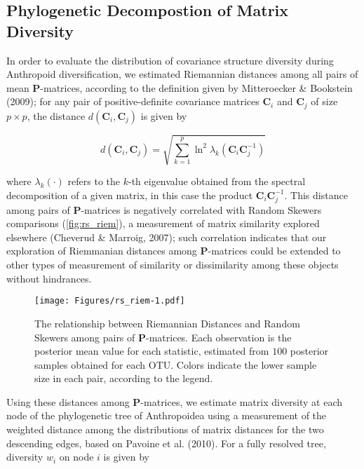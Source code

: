 \documentclass[12pt,twoside]{report}
\begin{document}
\subsection{Phylogenetic Decompostion of Matrix
Diversity}\label{phylogenetic-decompostion-of-matrix-diversity}

In order to evaluate the distribution of covariance structure diversity
during Anthropoid diversification, we estimated Riemannian distances
among all pairs of mean $\mathbf{P}$-matrices, according to the
definition given by Mitteroecker \& Bookstein (2009); for any pair of
positive-definite covariance matrices $\mathbf{C}_i$ and $\mathbf{C}_j$
of size $p \times p$, the distance $d(\mathbf{C}_i, \mathbf{C}_j)$ is
given by

\begin{equation}
d(\mathbf{C}_i, \mathbf{C}_j) = \sqrt{\sum_{k = 1}^p \ln^2 \lambda_k(\mathbf{C}_i\mathbf{C}_j^{-1})}
\label{eq:riemdist}
\end{equation}

where $\lambda_k(\cdot)$ refers to the $k$-th eigenvalue obtained from
the spectral decomposition of a given matrix, in this case the product
$\mathbf{C}_i\mathbf{C}_j^{-1}$. This distance among pairs of
$\mathbf{P}$-matrices is negatively correlated with Random Skewers
comparisons (\autoref{fig:rs_riem}), a measurement of matrix similarity
explored elsewhere (Cheverud \& Marroig, 2007); such correlation
indicates that our exploration of Riemmanian distances among
$\mathbf{P}$-matrices could be extended to other types of measurement of
similarity or dissimilarity among these objects without hindrances.

\begin{figure}[htbp]
\centering
\texttt{[image: Figures/rs\_riem-1.pdf]}
\caption{The relationship between Riemannian Distances and Random
Skewers among pairs of $\mathbf{P}$-matrices. Each observation is the
posterior mean value for each statistic, estimated from $100$ posterior
samples obtained for each OTU. Colors indicate the lower sample size in
each pair, according to the legend. \label{fig:rs_riem}}
\end{figure}

Using these distances among $\mathbf{P}$-matrices, we estimate matrix
diversity at each node of the phylogenetic tree of Anthropoidea using a
measurement of the weighted distance among the distributions of matrix
distances for the two descending edges, based on Pavoine et al. (2010).
For a fully resolved tree, diversity $w_i$ on node $i$ is given by
\end{document}

